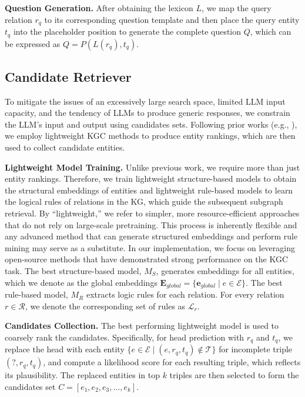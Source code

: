 \documentclass[11pt]{article}
\begin{document}
\noindent \textbf{Question Generation.}
After obtaining the lexicon $L$, we map the query relation $r_q$ to its corresponding question template and then place the query entity $t_q$ into the placeholder position to generate the complete question $Q$, which can be expressed as $Q=P(L(r_q),t_q)$. 

\subsection{Candidate Retriever}
To mitigate the issues of an excessively large search space, limited LLM input capacity, and the tendency of LLMs to produce generic responses, we constrain the LLM's input and output using candidates sets. Following prior works (e.g., \cite{zhang2024making,wei2024kicgpt,liu2024finetuninggenerativelargelanguage}), we employ lightweight KGC methods to produce entity rankings, which are then used to collect candidate entities.

\noindent \textbf{Lightweight Model Training.}
Unlike previous work, we require more than just entity rankings. Therefore, we train lightweight structure-based models to obtain the structural embeddings of entities and lightweight rule-based models to learn the logical rules of relations in the KG, which guide the subsequent subgraph retrieval. By “lightweight,” we refer to simpler, more resource-efficient approaches that do not rely on large-scale pretraining. This process is inherently flexible and any advanced method that can generate structured embeddings and perform rule mining may serve as a substitute. In our implementation, we focus on leveraging open-source methods that have demonstrated strong performance on the KGC task. The best structure-based model, $M_S$, generates embeddings for all entities, which we denote as the global embeddings $\mathbf{E}_{global} = \{ \mathbf{e}_{global} \mid e \in \mathcal{E} \}$. The best rule-based model, $M_R$ extracts logic rules for each relation. For every relation $r \in \mathcal{R}$, we denote the corresponding set of rules as $\mathcal{L}_r$.

\noindent \textbf{Candidates Collection.}
The best performing lightweight model is used to coarsely rank the candidates. Specifically, for head prediction with $r_q$ and $t_q$, we replace the head with each entity $\{e \in \mathcal{E} \mid (e, r_q, t_q) \notin \mathcal{T}\}$ for incomplete triple $(?,r_q,t_q)$, and compute a likelihood score for each resulting triple, which reflects its plausibility. The replaced entities in top $k$ triples are then selected to form the candidates set $C=[e_1,e_2,e_3,\dots,e_k]$.
\end{document}
